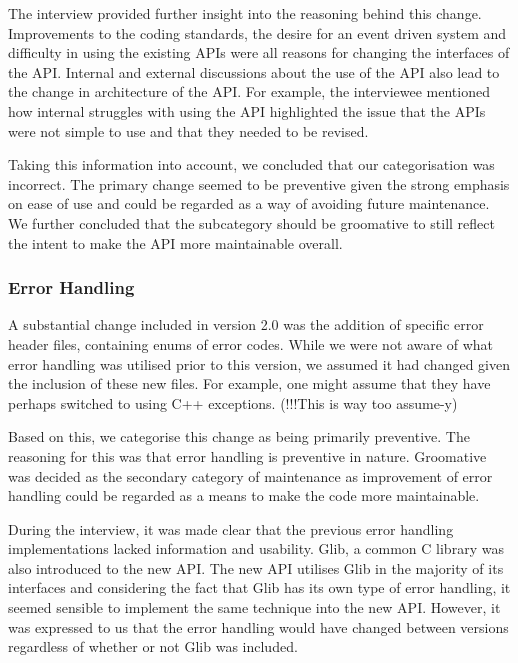 \documentclass{sig-alternate}
\begin{document}
The interview provided further insight into the reasoning behind this change. Improvements to the coding standards, the desire for an event driven system and difficulty in using the existing APIs were all reasons for changing the interfaces of the API. Internal and external discussions about the use of the API also lead to the change in architecture of the API. For example, the interviewee mentioned how internal struggles with using the API highlighted the issue that the APIs were not simple to use and that they needed to be revised.

Taking this information into account, we concluded that our categorisation was incorrect. The primary change seemed to be preventive given the strong emphasis on ease of use and could be regarded as a way of avoiding future maintenance. We further concluded that the subcategory should be groomative to still reflect the intent to make the API more maintainable overall.


\subsubsection{Error Handling}

A substantial change included in version 2.0 was the addition of specific error header files, containing enums of error codes. While we were not aware of what error handling was utilised prior to this version, we assumed it had changed given the inclusion of these new files. For example, one might assume that they have perhaps switched to using C++ exceptions. (!!!This is way too assume-y)

Based on this, we categorise this change as being primarily preventive. The reasoning for this was that error handling is preventive in nature. Groomative was decided as the secondary category of maintenance as improvement of error handling could be regarded as a means to make the code more maintainable. 

During the interview, it was made clear that the previous error handling implementations lacked information and usability. Glib, a common C library was also introduced to the new API. The new API utilises Glib in the majority of its interfaces and considering the fact that Glib has its own type of error handling, it seemed sensible to implement the same technique into the new API. However, it was expressed to us that the error handling would have changed between versions regardless of whether or not Glib was included.
\end{document}
